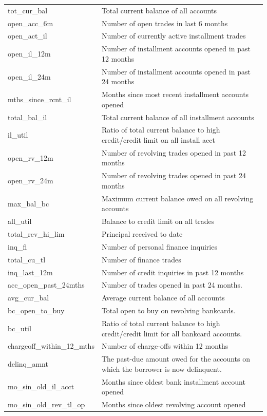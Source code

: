 \documentclass[11pt,]{report}
\begin{document}
\begin{longtable}[t]{>{\raggedright\arraybackslash}p{7cm}>{\raggedright\arraybackslash}p{7cm}}
tot\_cur\_bal & Total current balance of all accounts\\
open\_acc\_6m & Number of open trades in last 6 months\\
open\_act\_il & Number of currently active installment trades\\
open\_il\_12m & Number of installment accounts opened in past 12 months\\
\addlinespace
open\_il\_24m & Number of installment accounts opened in past 24 months\\
mths\_since\_rcnt\_il & Months since most recent installment accounts opened\\
total\_bal\_il & Total current balance of all installment accounts\\
il\_util & Ratio of total current balance to high credit/credit limit on all install acct\\
open\_rv\_12m & Number of revolving trades opened in past 12 months\\
\addlinespace
open\_rv\_24m & Number of revolving trades opened in past 24 months\\
max\_bal\_bc & Maximum current balance owed on all revolving accounts\\
all\_util & Balance to credit limit on all trades\\
total\_rev\_hi\_lim & Principal received to date\\
inq\_fi & Number of personal finance inquiries\\
\addlinespace
total\_cu\_tl & Number of finance trades\\
inq\_last\_12m & Number of credit inquiries in past 12 months\\
acc\_open\_past\_24mths & Number of trades opened in past 24 months.\\
avg\_cur\_bal & Average current balance of all accounts\\
bc\_open\_to\_buy & Total open to buy on revolving bankcards.\\
\addlinespace
bc\_util & Ratio of total current balance to high credit/credit limit for all bankcard accounts.\\
chargeoff\_within\_12\_mths & Number of charge-offs within 12 months\\
delinq\_amnt & The past-due amount owed for the accounts on which the borrower is now delinquent.\\
mo\_sin\_old\_il\_acct & Months since oldest bank installment account opened\\
mo\_sin\_old\_rev\_tl\_op & Months since oldest revolving account opened\\

\end{longtable}
\end{document}
